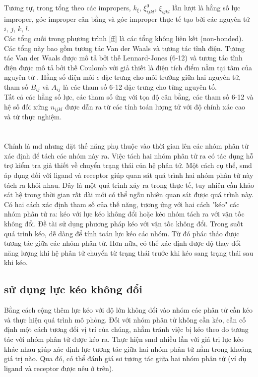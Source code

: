 \documentclass[12pt,a4paper,reqno, oneside]{book}
\begin{document}
		Tương tự, trong tổng theo các impropers, $k_{\xi}$, $\xi^{0}_{ijkl}$, $\xi_{ijkl}$ lần lượt là hằng số lực improper, góc improper cân bằng và góc improper thực tế tạo bởi các nguyên tử $i$, $j$, $k$, $l$.\\			
		Các tổng cuối trong phương trình \eqref{ff} là các tổng không liên kết (non-bonded). Các tổng này bao gồm tương tác Van der Waals và tương tác tĩnh điện. Tương tác Van der Waals được mô tả bởi thế Lennard-Jones (6-12) và tương tác tĩnh điện được mô tả bởi thế Coulomb với giả thiết là điện tích điểm nằm tại tâm của nguyên tử \cite{Ponder2003}. Hằng số điện môi $\epsilon$ đặc trưng cho môi trường giữa hai nguyên tử, tham số $B_{ij}$ và $A_{ij}$ là các tham số 6-12 đặc trưng cho từng nguyên tố.\\			
		Tất cả các hằng số lực, các tham số ứng với tọa độ cân bằng, các tham số 6-12 và hệ số đối xứng $n_{ijkl}$ được dẫn ra từ các tính toán lượng tử với độ chính xác cao và từ thực nghiệm\cite{Ponder2003}.
\section{}
Chính là \gls{md} nhưng đặt thế năng phụ thuộc vào thời gian lên các nhóm phân tử xác định để tách các nhóm này ra. Việc tách hai nhóm phân tử ra có tác dụng hỗ trợ kiểm tra giả thiết về chuyển trạng thái của hệ phân tử. Một cách cụ thể, \gls{smd} áp dụng đối với \gls{ligand} và \gls{receptor} giúp quan sát quá trình hai nhóm phân tử này tách ra khỏi nhau. Đây là một quá trình xảy ra trong thực tế, tuy nhiên cần khảo sát hệ trong thời gian rất dài mới có thể ngẫu nhiên quan sát được quá trình này.\\
Có hai cách xác định tham số của thế năng, tương ứng với hai cách "kéo" các nhóm phân tử ra: kéo với lực kéo không đổi hoặc kéo nhóm tách ra với vận tốc không đổi. Đề tài sử dụng phương pháp kéo với vận tốc không đổi\cite{Lu1998}. Trong suốt quá trình kéo, dễ dàng để tính toán lực kéo các nhóm. Từ đó phác thảo được tương tác giữa các nhóm phân tử. Hơn nữa, có thể xác định được độ thay đổi năng lượng khi hệ phân tử chuyển từ trạng thái trước khi kéo sang trạng thái sau khi kéo.
	\subsection{ sử dụng lực kéo không đổi}
	
	Bằng cách cộng thêm lực kéo với độ lớn không đổi vào nhóm các phân tử cần kéo và thực hiện quá trình mô phỏng. Đối với nhóm phân tử không cần kéo, cần cố định một cách tương đối vị trí của chúng, nhằm tránh việc bị kéo theo do tương tác với nhóm phân tử được kéo ra. Thực hiện \gls{smd} nhiều lần với giá trị lực kéo khác nhau giúp xác định lực tương tác giữa hai nhóm phân tử nằm trong khoảng giá trị nào. Qua đó, có thể đánh giá sơ tương tác giữa hai nhóm phân tử (ví dụ \gls{ligand} và \gls{receptor} được nêu ở trên).
\end{document}
